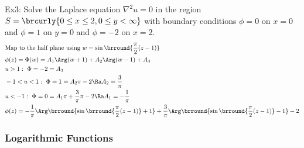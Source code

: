 Ex3: Solve the Laplace equation $\nabla^2u=0$ in the region $S=\brcurly{0\leq x\leq 2,0\leq y<\infty}$ with boundary conditions $\phi=0$ on $x=0$ and $\phi=1$ on $y=0$ and $\phi=-2$ on $x=2$.
\begin{align*}
    &\text{Map to the half plane using }w=\sin\brround{\frac{\pi}{2}(z-1)}\\
    &\phi(z)=\Phi(w)=A_1\Arg(w+1)+A_2\Arg(w-1)+A_3\\
    &u>1:\ \Phi=-2=A_3\\
    &-1<u<1:\ \Phi=1=A_2\pi-2\Ra A_2=\frac{3}{\pi}\\
    &u<-1:\ \Phi=0=A_1\pi+\frac{3}{\pi}\pi-2\Ra A_1=-\frac{1}{\pi}\\
    &\phi(z)=-\frac{1}{\pi}\Arg\brround{\sin\brround{\frac{\pi}{2}(z-1)}+1}+\frac{3}{\pi}\Arg\brround{\sin\brround{\frac{\pi}{2}(z-1)}-1}-2
\end{align*}

\subsubsection{Logarithmic Functions}